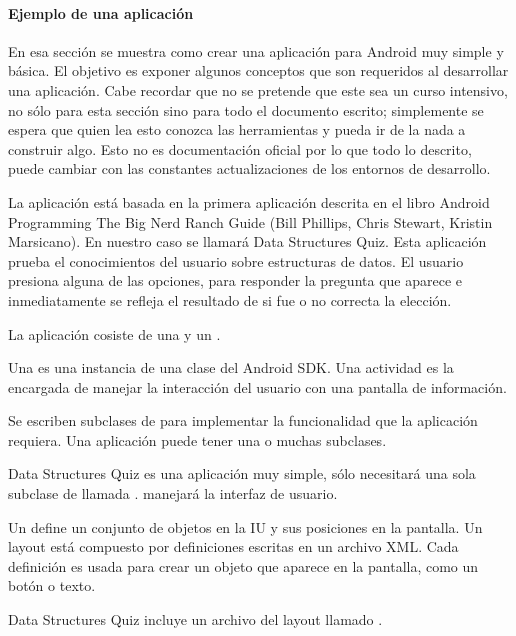 \paragraph{Ejemplo de una aplicación}
\label{\detokenize{dev_docs:una-primera-aplicacion}}
En esa sección se muestra como crear una aplicación para Android muy simple
y básica. El objetivo es exponer algunos conceptos que son requeridos al
desarrollar una aplicación. Cabe recordar que no se pretende que este sea un
curso intensivo, no sólo para esta sección sino para todo el documento escrito;
simplemente se espera que quien lea esto conozca las herramientas y pueda ir
de la nada a construir algo. Esto no es documentación oficial por lo que todo
lo descrito, puede cambiar con las constantes actualizaciones de los entornos
de desarrollo.

La aplicación está basada en la primera aplicación descrita en el libro Android
Programming The Big Nerd Ranch Guide (Bill Phillips, Chris Stewart, Kristin Marsicano).
En nuestro caso se llamará Data Structures Quiz. Esta aplicación prueba el
conocimientos del usuario sobre estructuras de datos. El usuario presiona
alguna de las opciones, para responder la pregunta que aparece e inmediatamente
se refleja el resultado de si fue o no correcta la elección.

La aplicación cosiste de una  y un .

Una  es una instancia de  una clase del Android SDK.
Una actividad es la encargada de manejar la interacción del usuario con una
pantalla de información.

Se escriben subclases de  para implementar la funcionalidad que la
aplicación requiera. Una aplicación puede tener una o muchas subclases.

Data Structures Quiz es una aplicación muy simple, sólo necesitará una sola
subclase de  llamada .  manejará la
interfaz de usuario.

Un  define un conjunto de objetos en la IU y sus posiciones en la
pantalla. Un layout está compuesto por definiciones escritas en un archivo
XML. Cada definición es usada para crear un objeto que aparece en la pantalla,
como un botón o texto.

Data Structures Quiz incluye un archivo del layout llamado .


